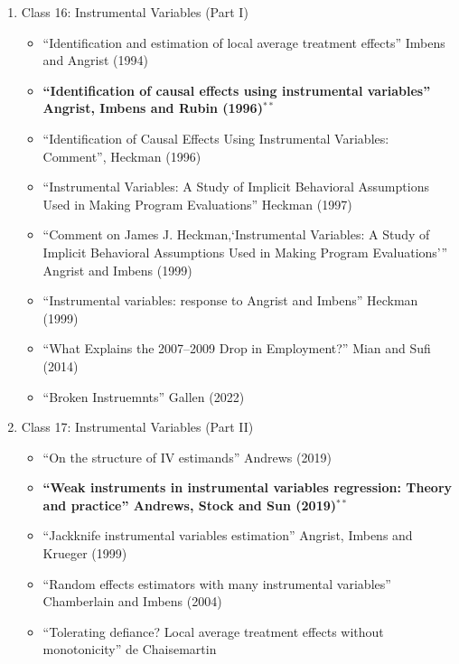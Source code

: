 \documentclass[11pt, a4paper]{article}
\begin{document}
\begin{enumerate}
\begin{enumerate}
\begin{itemize}
    \item \textbf{``Difference-in-Differences Designs: A Practitioner’s Guide'', Baker, Callaway, Cunningham, Goodman-Bacon and Sant'Anna (2025)}
    \item ``Difference-in-Differences with a Continuous Treatment'' Callaway, Goodman-Bacon and Sant'Anna (2021)
    \end{itemize}
  \item Class 16: Instrumental Variables (Part I)
    \begin{itemize}
    \item ``Identification and estimation of local average treatment effects'' Imbens and Angrist (1994)
    \item \textbf{``Identification of causal effects using instrumental variables'' Angrist, Imbens and Rubin (1996)}$^{**}$
    \item ``Identification of Causal Effects Using Instrumental Variables: Comment'', Heckman (1996)
    \item ``Instrumental Variables: A Study of Implicit Behavioral Assumptions Used in Making Program Evaluations'' Heckman (1997)
    \item ``Comment on James J. Heckman,`Instrumental Variables: A Study of Implicit Behavioral Assumptions Used in Making Program Evaluations''' Angrist and Imbens (1999)
    \item ``Instrumental variables: response to Angrist and Imbens'' Heckman (1999)
    \item ``What Explains the 2007–2009 Drop in Employment?'' Mian and Sufi (2014)
    \item ``Broken Instruemnts'' Gallen (2022)
    \end{itemize}
  \item Class 17: Instrumental Variables (Part II)
    \begin{itemize}
    \item ``On the structure of IV estimands'' Andrews (2019)
    \item \textbf{``Weak instruments in instrumental variables regression: Theory and practice'' Andrews, Stock and Sun (2019)}$^{**}$
    \item ``Jackknife instrumental variables estimation'' Angrist, Imbens and Krueger (1999)
    \item ``Random effects estimators with many instrumental variables'' Chamberlain and Imbens (2004)
    \item ``Tolerating defiance? Local average treatment effects without monotonicity'' de Chaisemartin

\end{itemize}
\end{enumerate}
\end{enumerate}
\end{document}
